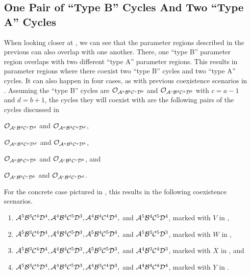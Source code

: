 \subsection{One Pair of ``Type B'' Cycles And Two ``Type A'' Cycles}

When looking closer at , we can see that the parameter regions described in the previous  can also overlap with one another.
There, one ``type B'' parameter region overlaps with two different ``type A'' parameter regions.
This results in parameter regions where there coexist two ``type B'' cycles and two ``type A'' cycles.
It can also happen in four cases, as with previous coexistence scenarios in .
Assuming the ``type B'' cycles are $\Cycle{\A^a\B^b\C^c\D^b}$ and $\Cycle{\A^c\B^d\C^a\D^b}$ with $c = a - 1$ and $d = b + 1$, the cycles they will coexist with are the following pairs of the cycles discussed in 
\begin{enumerate*}
	\item $\Cycle{\A^c\B^d\C^c\D^d}$ and $\Cycle{\A^a\B^d\C^a\D^d}$,
	\item $\Cycle{\A^a\B^d\C^a\D^d}$ and $\Cycle{\A^a\B^b\C^a\D^b}$,
	\item $\Cycle{\A^a\B^b\C^a\D^b}$ and $\Cycle{\A^c\B^b\C^c\D^b}$, and
	\item $\Cycle{\A^c\B^b\C^c\D^b}$ and $\Cycle{\A^c\B^d\C^c\D^d}$.
\end{enumerate*}
For the concrete case pictured in , this results in the following coexistence scenarios.
\begin{enumerate}
	\item $\A^5\B^3\C^4\D^4, \A^4\B^4\C^5\D^3, \A^4\B^4\C^4\D^4,$ and $\A^5\B^4\C^5\D^4$, marked with $V$ in ,
	\item $\A^5\B^3\C^4\D^4, \A^4\B^4\C^5\D^3, \A^5\B^4\C^5\D^4,$ and $\A^5\B^3\C^5\D^3$, marked with $W$ in ,
	\item $\A^5\B^3\C^4\D^4, \A^4\B^4\C^5\D^3, \A^5\B^3\C^5\D^3,$ and $\A^4\B^3\C^4\D^3$, marked with $X$ in , and
	\item $\A^5\B^3\C^4\D^4, \A^4\B^4\C^5\D^3, \A^4\B^3\C^4\D^3,$ and $\A^4\B^4\C^4\D^4$, marked with $Y$ in .
\end{enumerate}

